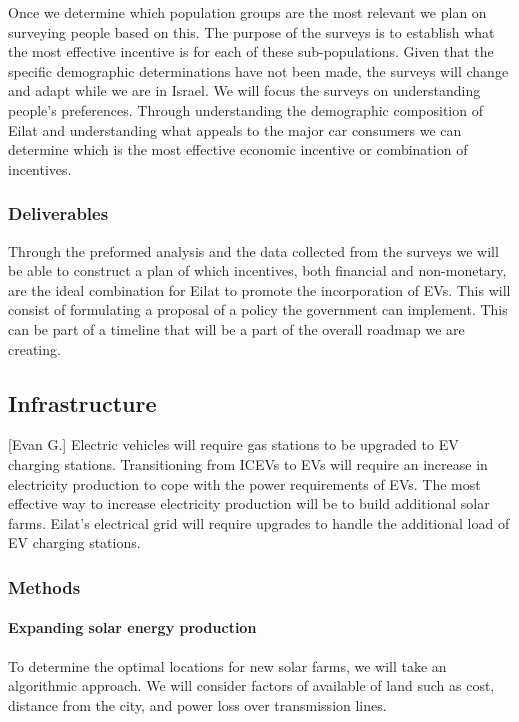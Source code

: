 \documentclass{article}                         %
\begin{document}
Once we determine which population groups are the most relevant we plan on surveying people based on this. The purpose of the surveys is to establish what the most effective incentive is for each of these sub-populations. Given that the specific demographic determinations have not been made, the surveys will change and adapt while we are in Israel. We will focus the surveys on understanding  people's preferences. Through understanding the demographic composition of Eilat and understanding what appeals to the major car consumers we can determine which is the most effective economic incentive or combination of incentives. 

\subsubsection{Deliverables}
Through the preformed analysis and the data collected from the surveys we will be able to construct a plan of which incentives, both financial and non-monetary, are the ideal combination for Eilat to promote the incorporation of EVs. This will consist of formulating a proposal of a policy the government can implement. This can be part of a timeline that will be a part of the overall roadmap we are creating. 

\subsection{Infrastructure}[Evan G.]
Electric vehicles will require gas stations to be upgraded to EV charging stations. Transitioning from ICEVs to EVs will require an increase in electricity production to cope with the power requirements of EVs. The most effective way to increase electricity production will be to build additional solar farms. Eilat's electrical grid will require upgrades to handle the additional load of EV charging stations. 
\subsubsection{Methods}
\paragraph{Expanding solar energy production}
To determine the optimal locations for new solar farms, we will take an algorithmic approach. We will consider factors of available of land such as cost, distance from the city, and power loss over transmission lines.

\end{document}
